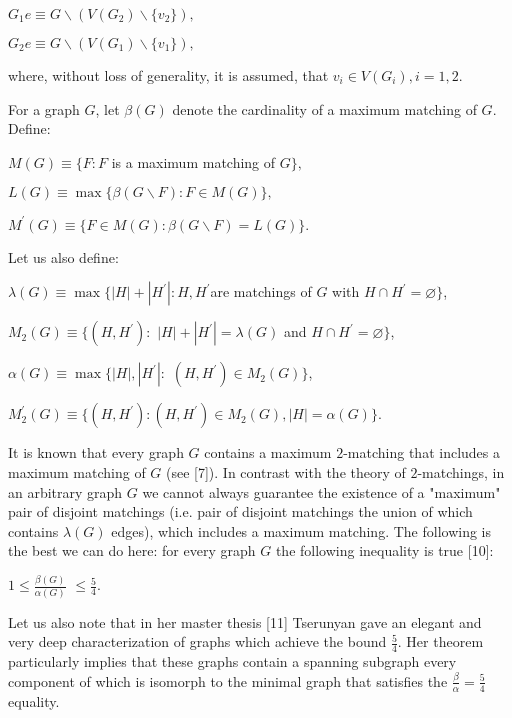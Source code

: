 \documentclass{article}
\begin{document}
\begin{center}
$G_{1}e\equiv G\backslash (V(G_{2})\backslash \{v_{2}\}),$

$G_{2}e\equiv G\backslash (V(G_{1})\backslash \{v_{1}\}),$
\end{center}

where, without loss of generality, it is assumed, that $v_{i}\in
V(G_{i}),i=1,2$.

For a graph $G$, let $\beta (G)$ denote the cardinality of a maximum
matching of $G$. Define:

\begin{center}
$M(G)\equiv \{F:F$ is a maximum matching of $G\},$

$L(G)\equiv \max \{\beta (G\backslash F):F\in M(G)\},$

$M^{\prime }(G)\equiv \{F\in M(G):\beta (G\backslash F)=L(G)\}.$
\end{center}

Let us also define:

\begin{center}
$\lambda (G)\equiv \max \{\left\vert H\right\vert +\left\vert H^{\prime
}\right\vert :H,H^{\prime }$are matchings of $G$ with $H\cap H^{\prime
}=\varnothing \}$,

$M_{2}(G)\equiv \{(H,H^{\prime }):$ $\left\vert H\right\vert +\left\vert
H^{\prime }\right\vert =\lambda (G)$ and $H\cap H^{\prime }=\varnothing \}$,

$\alpha (G)\equiv \max \{\left\vert H\right\vert ,\left\vert H^{\prime
}\right\vert :$ $(H,H^{\prime })\in M_{2}(G)\}$,

$M_{2}^{\prime }(G)\equiv \{(H,H^{\prime }):(H,H^{\prime })\in
M_{2}(G),\left\vert H\right\vert =\alpha (G)\}.$
\end{center}

It is known that every graph $G$ contains a maximum $2$-matching that
includes a maximum matching of $G$ (see [7]). In contrast with the theory of 
$2$-matchings, in an arbitrary graph $G$ we cannot always guarantee the
existence of a "maximum" pair of disjoint matchings (i.e. pair of disjoint
matchings the union of which contains $\lambda (G)$ edges), which includes a
maximum matching. The following is the best we can do here: for every graph $G$ the following inequality is true [10]:

\begin{center}
$1\leq \frac{\beta (G)}{\alpha (G)}$ $\leq \frac{5}{4}$.
\end{center}

Let us also note that in her master thesis [11] Tserunyan gave an elegant
and very deep characterization of graphs which achieve the bound $\frac{5}{4}
$. Her theorem particularly implies that these graphs contain a spanning
subgraph every component of which is isomorph to the minimal graph that
satisfies the $\frac{\beta }{\alpha }=\frac{5}{4}$ equality.
\end{document}
